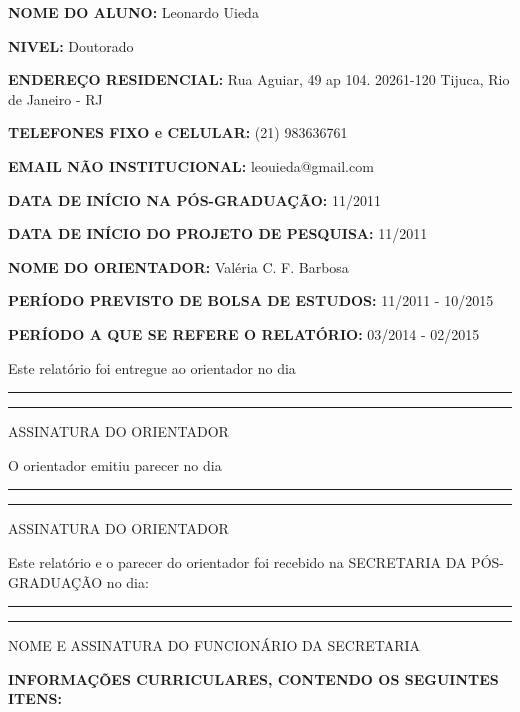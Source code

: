\documentclass[12pt,a4paper]{article}
\begin{document}
\begin{flushleft}

{\bfseries
NOME DO ALUNO:
}
Leonardo Uieda

{\bfseries
NIVEL:
}
Doutorado

{\bfseries
ENDEREÇO RESIDENCIAL:
}
Rua Aguiar, 49 ap 104. 20261-120 Tijuca, Rio de Janeiro - RJ

{\bfseries
TELEFONES FIXO e CELULAR:
}
(21) 983636761

{\bfseries
EMAIL NÃO INSTITUCIONAL:
}
leouieda@gmail.com

{\bfseries
DATA DE INÍCIO NA PÓS-GRADUAÇÃO:
}
11/2011

{\bfseries
DATA DE INÍCIO DO PROJETO DE PESQUISA:
}
11/2011

{\bfseries
NOME DO ORIENTADOR:
}
Valéria C. F. Barbosa

{\bfseries
PERÍODO PREVISTO DE BOLSA DE ESTUDOS:
}
11/2011 - 10/2015

{\bfseries
PERÍODO A QUE SE REFERE O RELATÓRIO:
}
03/2014 - 02/2015

\vfill

{\small Este relatório foi entregue ao orientador no dia}
\rule{1.5cm}{0.4pt}
\hfill
\rule{4cm}{0.4pt}

\vspace{-0.2cm}

\hfill {\tiny ASSINATURA DO ORIENTADOR}

\vspace{0.5cm}

{\small O orientador emitiu parecer no dia}
\rule{1.5cm}{0.4pt}
\hfill
\rule{4cm}{0.4pt}

\vspace{-0.2cm}
\hfill {\tiny ASSINATURA DO ORIENTADOR}

\vspace{0.5cm}

{\small Este relatório e o parecer do orientador foi recebido na
SECRETARIA DA PÓS-GRADUAÇÃO no dia:}

\vspace{0.5cm}

\rule{3cm}{0.4pt}
\hfill
\rule{10cm}{0.4pt}

\vspace{-0.2cm}

\hfill {\tiny NOME E ASSINATURA DO FUNCIONÁRIO DA SECRETARIA}

\end{flushleft}

\newpage

\begin{center}
\textbf{\large INFORMAÇÕES CURRICULARES, CONTENDO OS SEGUINTES ITENS:}
\end{center}
\end{document}
